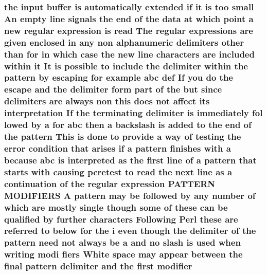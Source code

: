 \subsubsection[{\texorpdfstring{modifier}{modifier}}]{\setlength{\rightskip}{0pt plus 5cm}the {\bf input} {\bf buffer} {\bf is} automatically extended {\bf if} {\bf it} {\bf is} too small An {\bf empty} {\bf line} signals the {\bf end} {\bf of} the {\bf data} at {\bf which} {\bf point} {\bf a} new regular {\bf expression} {\bf is} {\bf read} The regular {\bf expressions} {\bf are} {\bf given} enclosed {\bf in} {\bf any} non {\bf alphanumeric} delimiters other {\bf than} for {\bf in} {\bf which} {\bf case} the new {\bf line} {\bf characters} {\bf are} {\bf included} within {\bf it} It {\bf is} {\bf possible} {\bf to} {\bf include} the delimiter within the {\bf pattern} by escaping for {\bf example} {\bf abc} def If you {\bf do} the escape and the delimiter form part {\bf of} the but since delimiters {\bf are} always non {\bf this} does {\bf not} affect its interpretation If the terminating delimiter {\bf is} immediately fol lowed by {\bf a} for {\bf abc} then {\bf a} {\bf backslash} {\bf is} added {\bf to} the {\bf end} {\bf of} the {\bf pattern} This {\bf is} {\bf done} {\bf to} provide {\bf a} {\bf way} {\bf of} testing the {\bf error} condition that {\bf arises} {\bf if} {\bf a} {\bf pattern} finishes {\bf with} {\bf a} because {\bf abc} {\bf is} interpreted {\bf as} the {\bf first} {\bf line} {\bf of} {\bf a} {\bf pattern} that starts {\bf with} causing {\bf pcretest} {\bf to} {\bf read} the next {\bf line} {\bf as} {\bf a} continuation {\bf of} the regular {\bf expression} P\+A\+T\+T\+E\+RN M\+O\+D\+I\+F\+I\+E\+RS {\bf A} {\bf pattern} may {\bf be} followed by {\bf any} {\bf number} {\bf of} {\bf which} {\bf are} mostly single {\bf though} some {\bf of} these {\bf can} {\bf be} qualified by further {\bf characters} Following {\bf Perl} these {\bf are} referred {\bf to} {\bf below} for the {\bf i} even {\bf though} the delimiter {\bf of} the {\bf pattern} need {\bf not} always {\bf be} {\bf a} and no {\bf slash} {\bf is} {\bf used} when writing modi fiers White {\bf space} may appear between the final {\bf pattern} delimiter and the {\bf first} modifier}\hypertarget{pcretest_8txt_acf129a198a3fef97e734822bd51b910d}{}\label{pcretest_8txt_acf129a198a3fef97e734822bd51b910d}

